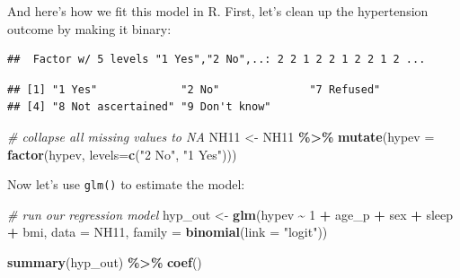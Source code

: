 \documentclass[
]{book}
\newenvironment{Shaded}{\begin{snugshade}}{\end{snugshade}}
\newcommand{\CommentTok}[1]{\textcolor[rgb]{0.56,0.35,0.01}{\textit{#1}}}
\newcommand{\DataTypeTok}[1]{\textcolor[rgb]{0.13,0.29,0.53}{#1}}
\newcommand{\DecValTok}[1]{\textcolor[rgb]{0.00,0.00,0.81}{#1}}
\newcommand{\KeywordTok}[1]{\textcolor[rgb]{0.13,0.29,0.53}{\textbf{#1}}}
\newcommand{\NormalTok}[1]{#1}
\newcommand{\OperatorTok}[1]{\textcolor[rgb]{0.81,0.36,0.00}{\textbf{#1}}}
\newcommand{\StringTok}[1]{\textcolor[rgb]{0.31,0.60,0.02}{#1}}
\begin{document}
And here's how we fit this model in R. First, let's clean up the hypertension outcome by making it binary:

\begin{Shaded}
\end{Shaded}

\begin{verbatim}
##  Factor w/ 5 levels "1 Yes","2 No",..: 2 2 1 2 2 1 2 2 1 2 ...
\end{verbatim}

\begin{Shaded}
\end{Shaded}

\begin{verbatim}
## [1] "1 Yes"             "2 No"              "7 Refused"        
## [4] "8 Not ascertained" "9 Don't know"
\end{verbatim}

\begin{Shaded}
\begin{Highlighting}[]
  \CommentTok{\# collapse all missing values to NA}
\NormalTok{  NH11 \textless{}{-}}\StringTok{ }\NormalTok{NH11 }\OperatorTok{\%\textgreater{}\%}
\StringTok{      }\KeywordTok{mutate}\NormalTok{(}\DataTypeTok{hypev =} \KeywordTok{factor}\NormalTok{(hypev, }\DataTypeTok{levels=}\KeywordTok{c}\NormalTok{(}\StringTok{"2 No"}\NormalTok{, }\StringTok{"1 Yes"}\NormalTok{)))}
\end{Highlighting}
\end{Shaded}

Now let's use \texttt{glm()} to estimate the model:

\begin{Shaded}
\begin{Highlighting}[]
  \CommentTok{\# run our regression model}
\NormalTok{  hyp\_out \textless{}{-}}\StringTok{ }\KeywordTok{glm}\NormalTok{(hypev }\OperatorTok{\textasciitilde{}}\StringTok{ }\DecValTok{1} \OperatorTok{+}\StringTok{ }\NormalTok{age\_p }\OperatorTok{+}\StringTok{ }\NormalTok{sex }\OperatorTok{+}\StringTok{ }\NormalTok{sleep }\OperatorTok{+}\StringTok{ }\NormalTok{bmi,}
                 \DataTypeTok{data =}\NormalTok{ NH11, }
                 \DataTypeTok{family =} \KeywordTok{binomial}\NormalTok{(}\DataTypeTok{link =} \StringTok{"logit"}\NormalTok{))}

  \KeywordTok{summary}\NormalTok{(hyp\_out) }\OperatorTok{\%\textgreater{}\%}\StringTok{ }\KeywordTok{coef}\NormalTok{()}
\end{Highlighting}
\end{Shaded}
\end{document}
